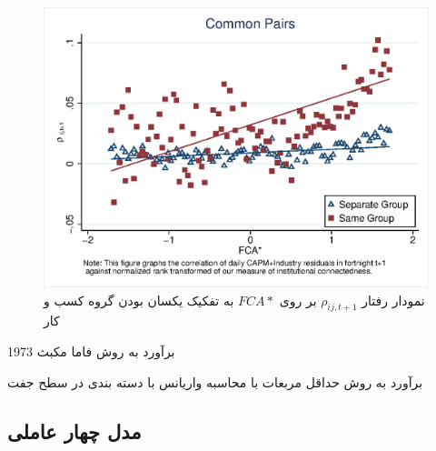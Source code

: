 \documentclass[12pt]{article}
\begin{document}
\begin{appendices}
  \begin{figure}[htbp]
   \centering
   \includegraphics[width=.7\linewidth]{wcorr2g.eps}
     \caption{نمودار رفتار  
         $ \rho_{ij,{t+1}} $
           بر روی 
     $ FCA* $ 
     به تفکیک یکسان بودن گروه کسب و کار}
     \label{f1}
   \end{figure}



\begin{table}[htbp]
\centering
\begin{LTR}
\lr{
   \resizebox{\textwidth}{!}{
   
   }
   }
\end{LTR}
\caption{برآورد به روش فاما مکبث 1973}
\label{t14}
\end{table}

 \begin{table}[htbp]
 \centering
 \begin{LTR}
 \lr{
    \resizebox{\textwidth}{!}{
    
    }
    }
 \end{LTR}
 \caption{برآورد به روش حداقل مربعات با محاسبه واریانس با دسته بندی در سطح جفت}
 \label{t17}
 \end{table}
\FloatBarrier

\subsection{مدل چهار عاملی}


\end{appendices}
\end{document}
